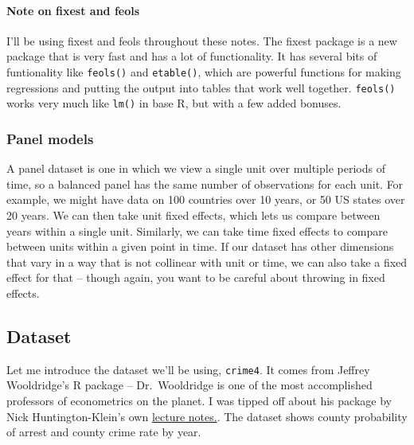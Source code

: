 \documentclass[
]{article}
\begin{document}
\hypertarget{note-on-fixest-and-feols}{%
\paragraph{Note on fixest and feols}\label{note-on-fixest-and-feols}}

I'll be using fixest and feols throughout these notes. The fixest
package is a new package that is very fast and has a lot of
functionality. It has several bits of funtionality like \texttt{feols()}
and \texttt{etable()}, which are powerful functions for making
regressions and putting the output into tables that work well together.
\texttt{feols()} works very much like \texttt{lm()} in base R, but with
a few added bonuses.

\hypertarget{panel-models}{%
\subsubsection{Panel models}\label{panel-models}}

A panel dataset is one in which we view a single unit over multiple
periods of time, so a balanced panel has the same number of observations
for each unit. For example, we might have data on 100 countries over 10
years, or 50 US states over 20 years. We can then take unit fixed
effects, which lets us compare between years within a single unit.
Similarly, we can take time fixed effects to compare between units
within a given point in time. If our dataset has other dimensions that
vary in a way that is not collinear with unit or time, we can also take
a fixed effect for that -- though again, you want to be careful about
throwing in fixed effects.

\hypertarget{dataset}{%
\subsection{Dataset}\label{dataset}}

Let me introduce the dataset we'll be using, \texttt{crime4}. It comes
from Jeffrey Wooldridge's R package -- Dr.~Wooldridge is one of the most
accomplished professors of econometrics on the planet. I was tipped off
about his package by Nick Huntington-Klein's own
\href{https://github.com/NickCH-K/EconometricsSlides}{lecture notes.}.
The dataset shows county probability of arrest and county crime rate by
year.
\end{document}
